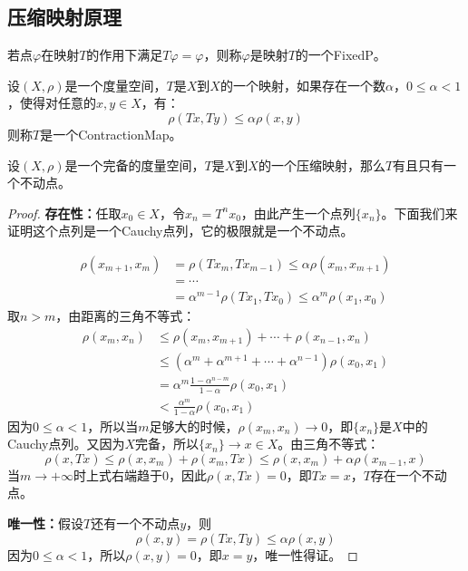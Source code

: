 \subsection{压缩映射原理}
\begin{definition}
	若点$\varphi$在映射$T$的作用下满足$T\varphi=\varphi$，则称$\varphi$是映射$T$的一个\gls{FixedP}。
\end{definition}
\begin{definition}
	设$(X,\rho)$是一个度量空间，$T$是$X$到$X$的一个映射，如果存在一个数$\alpha$，$0\leqslant\alpha<1$，使得对任意的$x,y\in X$，有：
	\begin{equation*}
		\rho(Tx,Ty)\leqslant\alpha\rho(x,y)
	\end{equation*}
	则称$T$是一个\gls{ContractionMap}。
\end{definition}
\begin{theorem}\label{theo:ContractionMapTheorem}
	设$(X,\rho)$是一个完备的度量空间，$T$是$X$到$X$的一个压缩映射，那么$T$有且只有一个不动点。
\end{theorem}
\begin{proof}
	\textbf{存在性：}任取$x_0\in X$，令$x_n=T^nx_0$，由此产生一个点列$\{x_n\}$。下面我们来证明这个点列是一个Cauchy点列，它的极限就是一个不动点。\par
	\begin{align*}
		\rho(x_{m+1},x_m)&=\rho(Tx_m,Tx_{m-1})\leqslant\alpha\rho(x_m,x_{m+1}) \\
		&=\cdots \\
		&=\alpha^{m-1}\rho(Tx_1,Tx_0)\leqslant\alpha^m\rho(x_1,x_0)
	\end{align*}
	取$n>m$，由距离的三角不等式：
	\begin{align*}
		\rho(x_m,x_n)
		&\leqslant\rho(x_m,x_{m+1})+\cdots+\rho(x_{n-1},x_n) \\
		&\leqslant(\alpha^m+\alpha^{m+1}+\cdots+\alpha^{n-1})\rho(x_0,x_1) \\
		&=\alpha^m\frac{1-\alpha^{n-m}}{1-\alpha}\rho(x_0,x_1) \\
		&<\frac{\alpha^m}{1-\alpha}\rho(x_0,x_1)
	\end{align*}
	因为$0\leqslant\alpha<1$，所以当$m$足够大的时候，$\rho(x_m,x_n)\rightarrow 0$，即$\{x_n\}$是$X$中的Cauchy点列。又因为$X$完备，所以$\{x_n\}\rightarrow x\in X$。由三角不等式：
	\begin{equation*}
		\rho(x,Tx)\leqslant\rho(x,x_m)+\rho(x_m,Tx)\leqslant\rho(x,x_m)+\alpha\rho(x_{m-1},x)
	\end{equation*}
	当$m\to+\infty$时上式右端趋于0，因此$\rho(x,Tx)=0$，即$Tx=x$，$T$存在一个不动点。\par
	\textbf{唯一性：}假设$T$还有一个不动点$y$，则
	\begin{equation*}
		\rho(x,y)=\rho(Tx,Ty)\leqslant\alpha\rho(x,y)
	\end{equation*}
	因为$0\leqslant\alpha<1$，所以$\rho(x,y)=0$，即$x=y$，唯一性得证。
\end{proof}
